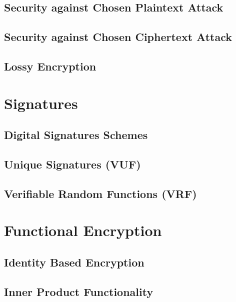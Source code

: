	\section{Security against Chosen Plaintext Attack}
	
	

	\section{Security against Chosen Ciphertext Attack}
	
	
	\section{Lossy Encryption}
	

\chapter{Signatures}
	\section{Digital Signatures Schemes}
	
	
	\section{Unique Signatures (VUF)}
	
	\section{Verifiable Random Functions (VRF)}
	
	
	
\chapter{Functional Encryption}
	\section{Identity Based Encryption}
	
	
	
	\section{Inner Product Functionality}
	
	
	
	
